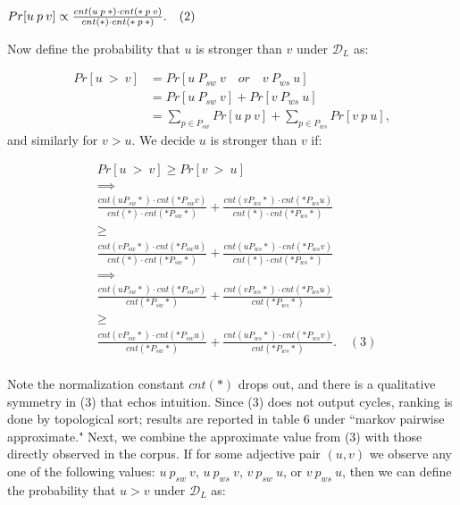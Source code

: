 \begin{math}
Pr[u \: p \: v] \propto \frac{ cnt(u \: p \: *) \cdot cnt(* \: p \: v) }{ cnt(*) \cdot cnt(* \: p \: *)}. \quad (2) \\
\end{math}

Now define the probability that $u$ is stronger than $v$ under $\mathcal{D}_L$ as:

\begin{align*}
  Pr[u \: > \: v] &= Pr[ u \: P_{sw} \: v  \quad or \quad v \: P_{ws} \: u] \\
          &= Pr[ u \: P_{sw} \: v] + Pr[ v \: P_{ws} \: u] \\
          &= \sum_{p \in P_{sw}} Pr[u \: p \: v] + \sum_{p \in P_{ws}} Pr[v \: p \: u],
\end{align*}
and similarly for $v > u$. We decide $u$ is stronger than $v$ if:

\begin{align*}
  &Pr[u \: > \: v] \ge Pr[v \: > \: u] \\
  &\implies \\
  &\frac{ cnt(u P_{sw} *) \cdot cnt(* P_{sw} v) }{ cnt(*) \cdot cnt(* P_{sw} *)} 
  + \frac{ cnt(v P_{ws} *) \cdot cnt(* P_{ws} u) }{ cnt(*) \cdot cnt(* P_{ws} *)} \\
  &\ge\\
  &\frac{ cnt(v P_{sw} *) \cdot cnt(* P_{sw} u) }{ cnt(*) \cdot cnt(* P_{sw} *)} 
  + \frac{ cnt(u P_{ws} *) \cdot cnt(* P_{ws} v) }{ cnt(*) \cdot cnt(* P_{ws} *)} \\
  &\implies\\
  &\frac{ cnt(u P_{sw} *) \cdot cnt(* P_{sw} v) }{ cnt(* P_{sw} *)} 
  + \frac{ cnt(v P_{ws} *) \cdot cnt(* P_{ws} u) }{ cnt(* P_{ws} *)} \\
  &\ge\\
  &\frac{ cnt(v P_{sw} *) \cdot cnt(* P_{sw} u) }{ cnt(* P_{sw} *)} 
  + \frac{ cnt(u P_{ws} *) \cdot cnt(* P_{ws} v) }{ cnt(* P_{ws} *)}. \quad (3) \\
\end{align*}

Note the normalization constant $cnt(*)$ drops out, and there is a qualitative symmetry in (3) that echos intuition. Since (3) does not output cycles, ranking is done by topological sort; results are reported in table 6 under ``markov pairwise approximate."  Next, we combine the approximate value from (3) with those directly observed in the corpus. If for some adjective pair $(u,v)$ we observe any one of the following values: $u \: p_{sw} \: v$, $u \: p_{ws} \: v$, $v \: p_{sw} \: u$, or $v \: p_{ws} \: u$, then we can define the probability that $u > v$ under $\mathcal{D}_L$ as:

